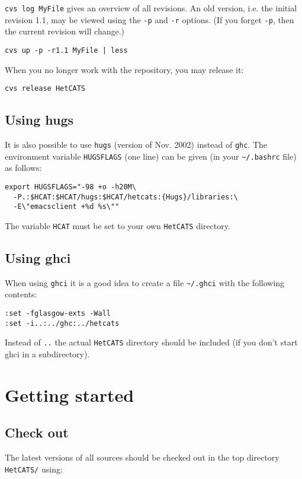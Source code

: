 \documentclass{article}
\begin{document}
\texttt{cvs log MyFile} gives an overview of all revisions. An old
version, i.e. the initial revision 1.1, may be viewed using the
\texttt{-p} and \texttt{-r} options. (If you forget \texttt{-p}, then the
current revision will change.)

\begin{verbatim}
cvs up -p -r1.1 MyFile | less
\end{verbatim}

When you no longer work with the repository, you may release it:

\begin{verbatim}
cvs release HetCATS
\end{verbatim}

\subsection{Using hugs}

It is also possible to use \texttt{hugs} (version of Nov. 2002) instead of
\texttt{ghc}.  The environment variable \texttt{HUGSFLAGS} (one line) can be
given (in your \texttt{\~{}/.bashrc} file) as follows:

\begin{verbatim}
export HUGSFLAGS="-98 +o -h20M\
  -P.:$HCAT:$HCAT/hugs:$HCAT/hetcats:{Hugs}/libraries:\
  -E\"emacsclient +%d %s\""
\end{verbatim}

The variable \texttt{HCAT} must be set to your own \texttt{HetCATS} directory.

\subsection{Using ghci}

When using \texttt{ghci} it is a good idea to create a file
\texttt{\~{}/.ghci} with the following contents:

\begin{verbatim}
:set -fglasgow-exts -Wall 
:set -i..:../ghc:../hetcats
\end{verbatim}

Instead of \texttt{..} the actual \texttt{HetCATS} directory should be
included (if you don't start ghci in a subdirectory).

\section{Getting started}

\subsection{Check out}
The latest versions of all sources should be checked out in the top
directory \texttt{HetCATS/} using:
\end{document}
